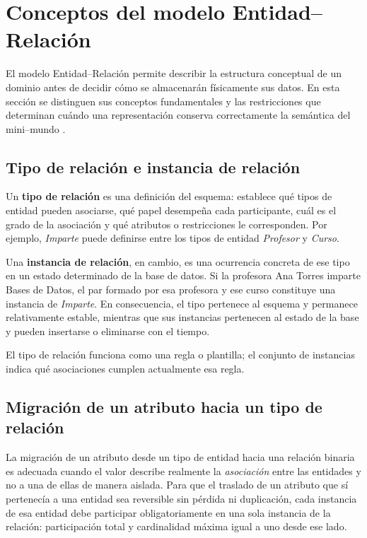 \section{Conceptos del modelo Entidad--Relación}

El modelo Entidad--Relación permite describir la estructura conceptual de un
dominio antes de decidir cómo se almacenarán físicamente sus datos. En esta
sección se distinguen sus conceptos fundamentales y las restricciones que
determinan cuándo una representación conserva correctamente la semántica del
mini--mundo \cite{elmasri2016fundamentals}.

\subsection{Tipo de relación e instancia de relación}

Un \textbf{tipo de relación} es una definición del esquema: establece qué tipos
de entidad pueden asociarse, qué papel desempeña cada participante, cuál es el
grado de la asociación y qué atributos o restricciones le corresponden. Por
ejemplo, \emph{Imparte} puede definirse entre los tipos de entidad
\emph{Profesor} y \emph{Curso}.

Una \textbf{instancia de relación}, en cambio, es una ocurrencia concreta de ese
tipo en un estado determinado de la base de datos. Si la profesora Ana Torres
imparte Bases de Datos, el par formado por esa profesora y ese curso constituye
una instancia de \emph{Imparte}. En consecuencia, el tipo pertenece al esquema
y permanece relativamente estable, mientras que sus instancias pertenecen al
estado de la base y pueden insertarse o eliminarse con el tiempo.

\begin{conceptobox}
El tipo de relación funciona como una regla o plantilla; el conjunto de
instancias indica qué asociaciones cumplen actualmente esa regla.
\end{conceptobox}

\subsection{Migración de un atributo hacia un tipo de relación}

La migración de un atributo desde un tipo de entidad hacia una relación binaria
es adecuada cuando el valor describe realmente la \emph{asociación} entre las
entidades y no a una de ellas de manera aislada. Para que el traslado de un
atributo que sí pertenecía a una entidad sea reversible sin pérdida ni
duplicación, cada instancia de esa entidad debe participar obligatoriamente en
una sola instancia de la relación: participación total y cardinalidad máxima
igual a uno desde ese lado.

